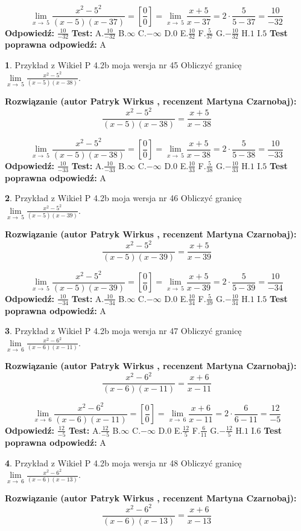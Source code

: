 \documentclass[12pt, a4paper]{article}
\theoremstyle{definition} %
\newtheorem{zad}{}
\newcommand{\zadStart}[1]{\begin{zad}#1\newline}
\newcommand{\zadStop}{\end{zad}}
\newcommand{\rozwStart}[2]{\noindent \textbf{Rozwiązanie (autor #1 , recenzent #2): }\newline}
\newcommand{\rozwStop}{\newline}
\newcommand{\odpStart}{\noindent \textbf{Odpowiedź:}\newline}
\newcommand{\odpStop}{\newline}
\newcommand{\testStart}{\noindent \textbf{Test:}\newline}
\newcommand{\testStop}{\newline}
\newcommand{\kluczStart}{\noindent \textbf{Test poprawna odpowiedź:}\newline}
\newcommand{\kluczStop}{\newline}
\begin{document}
$$\lim\limits_{x\to\ 5}\frac{x^{2}-5^{2}}{(x-5)(x-37)}=[\frac{0}{0}]=\lim\limits_{x\to\ 5}\frac{x+5}{x-37}=2 \cdot \frac{5}{5-37} = \frac{10}{-32}$$
\rozwStop
\odpStart
$\frac{10}{-32}$
\odpStop
\testStart
A.$\frac{10}{-32}$
B.$\infty$
C.$-\infty$
D.$0$
E.$\frac{10}{32}$
F.$\frac{5}{37}$
G.$-\frac{10}{32}$
H.$1$
I.$5$
\testStop
\kluczStart
A
\kluczStop



\zadStart{Przykład z Wikieł P 4.2b moja wersja nr 45}
Obliczyć granicę $\lim\limits_{x\to\ 5}\frac{x^{2}-5^{2}}{(x-5)(x-38)}$.
\zadStop
\rozwStart{Patryk Wirkus}{Martyna Czarnobaj}
$$\frac{x^{2}-5^{2}}{(x-5)(x-38)}=\frac{x+5}{x-38}$$

$$\lim\limits_{x\to\ 5}\frac{x^{2}-5^{2}}{(x-5)(x-38)}=[\frac{0}{0}]=\lim\limits_{x\to\ 5}\frac{x+5}{x-38}=2 \cdot \frac{5}{5-38} = \frac{10}{-33}$$
\rozwStop
\odpStart
$\frac{10}{-33}$
\odpStop
\testStart
A.$\frac{10}{-33}$
B.$\infty$
C.$-\infty$
D.$0$
E.$\frac{10}{33}$
F.$\frac{5}{38}$
G.$-\frac{10}{33}$
H.$1$
I.$5$
\testStop
\kluczStart
A
\kluczStop



\zadStart{Przykład z Wikieł P 4.2b moja wersja nr 46}
Obliczyć granicę $\lim\limits_{x\to\ 5}\frac{x^{2}-5^{2}}{(x-5)(x-39)}$.
\zadStop
\rozwStart{Patryk Wirkus}{Martyna Czarnobaj}
$$\frac{x^{2}-5^{2}}{(x-5)(x-39)}=\frac{x+5}{x-39}$$

$$\lim\limits_{x\to\ 5}\frac{x^{2}-5^{2}}{(x-5)(x-39)}=[\frac{0}{0}]=\lim\limits_{x\to\ 5}\frac{x+5}{x-39}=2 \cdot \frac{5}{5-39} = \frac{10}{-34}$$
\rozwStop
\odpStart
$\frac{10}{-34}$
\odpStop
\testStart
A.$\frac{10}{-34}$
B.$\infty$
C.$-\infty$
D.$0$
E.$\frac{10}{34}$
F.$\frac{5}{39}$
G.$-\frac{10}{34}$
H.$1$
I.$5$
\testStop
\kluczStart
A
\kluczStop



\zadStart{Przykład z Wikieł P 4.2b moja wersja nr 47}
Obliczyć granicę $\lim\limits_{x\to\ 6}\frac{x^{2}-6^{2}}{(x-6)(x-11)}$.
\zadStop
\rozwStart{Patryk Wirkus}{Martyna Czarnobaj}
$$\frac{x^{2}-6^{2}}{(x-6)(x-11)}=\frac{x+6}{x-11}$$

$$\lim\limits_{x\to\ 6}\frac{x^{2}-6^{2}}{(x-6)(x-11)}=[\frac{0}{0}]=\lim\limits_{x\to\ 6}\frac{x+6}{x-11}=2 \cdot \frac{6}{6-11} = \frac{12}{-5}$$
\rozwStop
\odpStart
$\frac{12}{-5}$
\odpStop
\testStart
A.$\frac{12}{-5}$
B.$\infty$
C.$-\infty$
D.$0$
E.$\frac{12}{5}$
F.$\frac{6}{11}$
G.$-\frac{12}{5}$
H.$1$
I.$6$
\testStop
\kluczStart
A
\kluczStop



\zadStart{Przykład z Wikieł P 4.2b moja wersja nr 48}
Obliczyć granicę $\lim\limits_{x\to\ 6}\frac{x^{2}-6^{2}}{(x-6)(x-13)}$.
\zadStop
\rozwStart{Patryk Wirkus}{Martyna Czarnobaj}
$$\frac{x^{2}-6^{2}}{(x-6)(x-13)}=\frac{x+6}{x-13}$$
\end{document}

